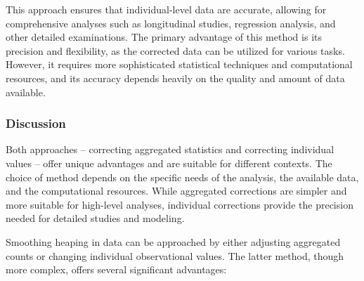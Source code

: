 \documentclass[pdflatex,sn-mathphys-num]{sn-jnl}%
\theoremstyle{thmstyleone}%
\theoremstyle{thmstyletwo}%
\theoremstyle{thmstylethree}%
\begin{document}
This approach ensures that individual-level data are accurate, allowing for comprehensive analyses such as longitudinal studies, regression analysis, and other detailed examinations. The primary advantage of this method is its precision and flexibility, as the corrected data can be utilized for various tasks. However, it requires more sophisticated statistical techniques and computational resources, and its accuracy depends heavily on the quality and amount of data available.



\subsubsection{Discussion}

Both approaches -- correcting aggregated statistics and correcting individual values -- offer unique advantages and are suitable for different contexts. The choice of method depends on the specific needs of the analysis, the available data, and the computational resources. While aggregated corrections are simpler and more suitable for high-level analyses, individual corrections provide the precision needed for detailed studies and modeling.

Smoothing heaping in data can be approached by either adjusting aggregated counts or changing individual observational values. The latter method, though more complex, offers several significant advantages:
\end{document}
